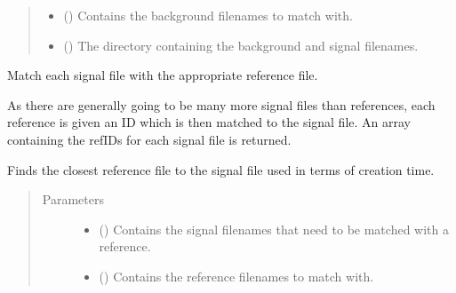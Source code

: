 \documentclass[a4paper,10pt,english]{sphinxmanual}
\begin{document}
\begin{fulllineitems}
\begin{fulllineitems}
\begin{quote}
\begin{description}
\begin{itemize}
\item {} 
\sphinxAtStartPar
{} () \textendash{} Contains the background filenames to match with.

\item {} 
\sphinxAtStartPar
{} () \textendash{} The directory containing the background and signal filenames.

\end{itemize}

\end{description}\end{quote}

\end{fulllineitems}


\begin{fulllineitems}
\label{\detokenize{sfgtools:sfgtools.SFGProcessTools.match_files_with_reference}}
\sphinxAtStartPar
Match each signal file with the appropriate reference file.

\sphinxAtStartPar
As there are generally going to be many more signal files than references, each reference is given
an ID which is then matched to the signal file. An array containing the refIDs for each signal file
is returned.

\sphinxAtStartPar
Finds the closest reference file to the signal file used in terms of creation time.
\begin{quote}\begin{description}
\item[{Parameters}] \leavevmode\begin{itemize}
\item {} 
\sphinxAtStartPar
{} () \textendash{} Contains the signal filenames that need to be matched with a reference.

\item {} 
\sphinxAtStartPar
{} () \textendash{} Contains the reference filenames to match with.


\end{itemize}
\end{description}
\end{quote}
\end{fulllineitems}
\end{fulllineitems}
\end{document}

